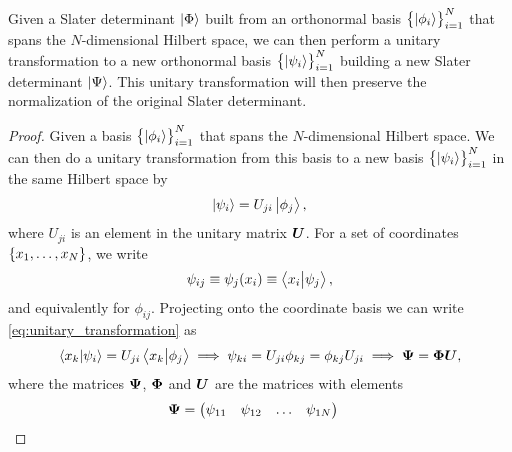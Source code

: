         \begin{lemma}
            Given a Slater determinant $\ket{\Phi}$ built from an
            orthonormal basis $\left\{ \ket{\phi_i} \right\}_{i = 1}^{N}$ that spans
            the $N$-dimensional Hilbert space, we can then perform a unitary
            transformation to a new orthonormal basis
            $\left\{ \ket{\psi_i} \right\}_{i = 1}^{N}$ building a new Slater
            determinant $\ket{\Psi}$.
            This unitary transformation will then preserve the normalization
            of the original Slater determinant.
        \end{lemma}

        \begin{proof}
            \label{proof:slater_determinants_invariant}
            Given a basis $\left\{ \ket{\phi_i} \right\}_{i = 1}^{N}$ that spans the
            $N$-dimensional Hilbert space. We can then do a unitary
            transformation from this basis to a new basis
            $\left\{ \ket{\psi_i} \right\}_{i = 1}^{N}$ in the same Hilbert space by
            \begin{align}
                \ket{\psi_i} = U_{ji}\ket{\phi_j},
                \label{eq:unitary_transformation}
            \end{align}
            where $U_{ji}$ is an element in the unitary matrix $\boldsymbol{U}$.
            For a set of coordinates
            $\left\{ x_1, \dots, x_N \right\}$, we write
            \begin{align}
                \psi_{ij} \equiv \psi_j(x_i)
                \equiv \braket{x_i}{\psi_j},
            \end{align}
            and equivalently for $\phi_{ij}$. Projecting onto the coordinate
            basis we can write \autoref{eq:unitary_transformation} as
            \begin{gather}
                \braket{x_k}{\psi_i}
                = U_{ji}\braket{x_k}{\phi_j}
                \implies
                \psi_{ki} = U_{ji}\phi_{kj} = \phi_{kj}U_{ji}
                \implies \boldsymbol{\Psi} = \boldsymbol{\Phi}\boldsymbol{U},
            \end{gather}
            where the matrices $\boldsymbol{\Psi}$, $\boldsymbol{\Phi}$ and $\boldsymbol{U}$ are
            the matrices with elements
            \begin{align}
                \boldsymbol{\Psi}
                &= \begin{pmatrix}
                    \psi_{11} & \psi_{12} & \dots & \psi_{1N} \\

\end{pmatrix}
\end{align}
\end{proof}
